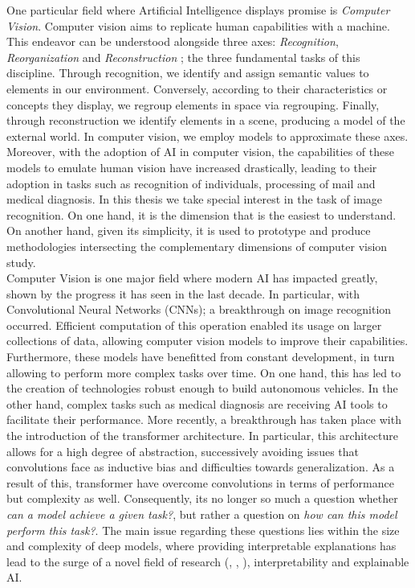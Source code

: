 \noindent One particular field where Artificial Intelligence displays promise is \emph{Computer 
Vision}. Computer vision aims to replicate human capabilities with a machine. This endeavor 
can be understood alongside three axes: \emph{Recognition}, \emph{Reorganization} and 
\emph{Reconstruction} \autocite{malik2016three}; the three fundamental tasks of this discipline.
Through recognition, we identify and assign semantic values to elements in our environment. 
Conversely, according to their characteristics or concepts they display, we regroup elements 
in space via regrouping. Finally, through reconstruction we identify elements in a scene, producing 
a model of the external world. In computer vision, we employ models to approximate these axes. 
Moreover, with the adoption of AI in computer vision, the capabilities of these models to emulate 
human vision have increased drastically, leading to their adoption in tasks such as recognition of 
individuals, processing of mail and medical diagnosis. In this thesis we  take special interest in 
the task of image recognition. On one hand, it is the dimension that is the easiest to understand. 
On another hand, given its simplicity, it is used to prototype and produce methodologies 
intersecting the complementary dimensions of computer vision study.\\

\noindent Computer Vision is one major field where modern AI has impacted greatly, shown by the 
progress it has seen in the last decade. In particular, with Convolutional Neural Networks (CNNs); a 
breakthrough on image recognition occurred. Efficient computation of this 
operation enabled its usage on larger collections of data, allowing computer vision models to 
improve their capabilities. Furthermore, these models have benefitted from constant development, in 
turn allowing to perform more complex tasks over time. On one hand, this has led to the creation 
of technologies robust enough to build autonomous vehicles. In the other hand, complex tasks such  
as medical diagnosis are receiving AI tools to facilitate their performance. More recently, a 
breakthrough has taken place with the introduction of the transformer architecture. 
In particular, this architecture allows for a high degree of abstraction, successively avoiding 
issues that convolutions face as inductive bias and difficulties  towards generalization. As a 
result of this, transformer have overcome convolutions in terms of performance but complexity as 
well. Consequently, its no longer so much a question whether \textit{can a model achieve a given 
task?}, but rather a question on \textit{how can this model perform this task?}. The main 
issue regarding these questions lies within the size and complexity of deep models, where 
providing interpretable explanations has lead to the surge of a novel field of research 
(\cite{li2018deep}, \cite{guidotti2018survey}, \cite{bodria2021benchmarking}), interpretability 
and explainable AI.\\


